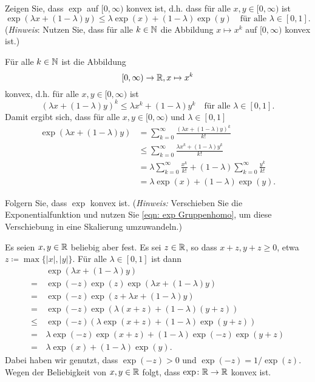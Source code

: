 \documentclass[a4paper,10pt]{article}
\begin{document}
\begin{question}
 Zeigen Sie, dass $\exp$ auf $[0,\infty)$ konvex ist, d.h. dass für alle $x,y \in [0,\infty)$ ist
 \[
  \exp(\lambda x + (1-\lambda) y)
  \leq \lambda \exp(x) + (1-\lambda) \exp(y)
  \quad
  \text{für alle $\lambda \in [0,1]$}.
 \]
 (\emph{Hinweis}: Nutzen Sie, dass für alle $k \in \mathbb{N}$ die Abbildung $x \mapsto x^k$ auf $[0,\infty)$ konvex ist.)
\end{question}
\begin{solution}
 Für alle $k \in \mathbb{N}$ ist die Abbildung
 \[
  [0, \infty) \to \mathbb{R}, x \mapsto x^k
 \]
 konvex, d.h. für alle $x,y \in [0,\infty)$ ist
 \[
  (\lambda x + (1-\lambda) y)^k
  \leq \lambda x^k + (1-\lambda) y^k
  \quad
  \text{für alle $\lambda \in [0,1]$}.
 \]
 Damit ergibt sich, dass für alle $x,y \in [0,\infty)$ und $\lambda \in [0,1]$
 \begin{align*}
  \exp(\lambda x + (1-\lambda) y)
  &= \sum_{k=0}^\infty \frac{(\lambda x + (1-\lambda) y)^k}{k!} \\
  &\leq \sum_{k=0}^\infty \frac{\lambda x^k + (1-\lambda) y^k}{k!} \\
  &= \lambda \sum_{k=0}^\infty \frac{x^k}{k!} + (1-\lambda) \sum_{k=0}^\infty \frac{y^k}{k!} \\
  &= \lambda \exp(x) + (1-\lambda) \exp(y).
 \end{align*}
\end{solution}


\begin{question}
 Folgern Sie, dass $\exp$ konvex ist. (\emph{Hinweis:} Verschieben Sie die Exponentialfunktion und nutzen Sie \eqref{eqn: exp Gruppenhomo}, um diese Verschiebung in eine Skalierung umzuwandeln.)
\end{question}
\begin{solution}
 Es seien $x,y \in \mathbb{R}$ beliebig aber fest. Es sei $z \in \mathbb{R}$, so dass $x+z, y+z \geq 0$, etwa $z \coloneqq \max\{|x|,|y|\}$. Für alle $\lambda \in [0,1]$ ist dann
 \begin{align*}
      &\, \exp(\lambda x + (1-\lambda) y) \\
     =&\, \exp(-z) \exp(z) \exp(\lambda x + (1-\lambda) y) \\
     =&\, \exp(-z) \exp(z + \lambda x + (1-\lambda) y) \\
     =&\, \exp(-z) \exp(\lambda (x+z) + (1-\lambda) (y+z)) \\
  \leq&\, \exp(-z) \left( \lambda \exp(x+z) + (1-\lambda) \exp(y+z) \right) \\
     =&\, \lambda \exp(-z) \exp(x+z) + (1-\lambda) \exp(-z) \exp(y+z) \\
     =&\, \lambda \exp(x) + (1-\lambda) \exp(y).
 \end{align*}
 Dabei haben wir genutzt, dass $\exp(-z) > 0$ und $\exp(-z) = 1/\exp(z)$. Wegen der Beliebigkeit von $x,y \in \mathbb{R}$ folgt, dass $\exp \colon \mathbb{R} \to \mathbb{R}$ konvex ist.
\end{solution}







\newpage


\printsolutions
\end{document}
